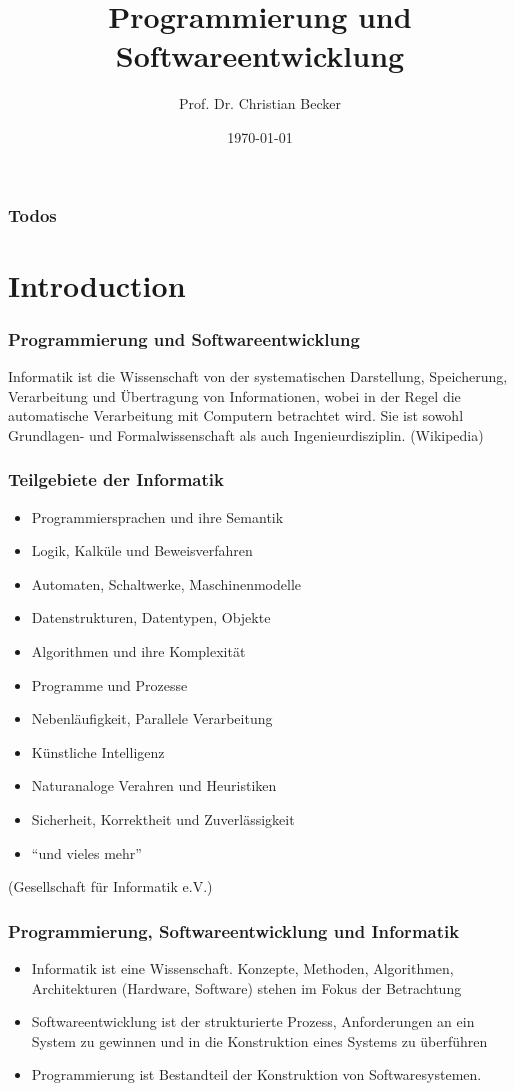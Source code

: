\documentclass{../../presentation}
\title{Programmierung und Softwareentwicklung}
\author{Prof. Dr. Christian Becker}
\institute{Universität Stuttgart, Institut für Parallele und Verteilte Systeme}
\date{\today}
\begin{document}
\begin{frame}
  \titlepage
\end{frame}

\begin{frame}
  \frametitle{Todos}
  \listoftodos{}
\end{frame}

\section{Introduction}

\begin{frame}[fragile]
  \frametitle{Programmierung und Softwareentwicklung}

  Informatik ist die Wissenschaft von der systematischen Darstellung, Speicherung, Verarbeitung und Übertragung von Informationen, wobei in der Regel die automatische Verarbeitung mit Computern betrachtet wird. Sie ist sowohl Grundlagen- und Formalwissenschaft als auch Ingenieurdisziplin. (Wikipedia)
\end{frame}

\begin{frame}[fragile]
  \frametitle{Teilgebiete der Informatik}

  \begin{itemize}
    \item Programmiersprachen und ihre Semantik
    \item Logik, Kalküle und Beweisverfahren
    \item Automaten, Schaltwerke, Maschinenmodelle
    \item Datenstrukturen, Datentypen, Objekte
    \item Algorithmen und ihre Komplexität
    \item Programme und Prozesse
    \item Nebenläufigkeit, Parallele Verarbeitung
    \item Künstliche Intelligenz
    \item Naturanaloge Verahren und Heuristiken
    \item Sicherheit, Korrektheit und Zuverlässigkeit
    \item \enquote{und vieles mehr}
  \end{itemize}
  (Gesellschaft für Informatik e.V.)
\end{frame}

\begin{frame}[fragile]
  \frametitle{Programmierung, Softwareentwicklung und Informatik}

  \begin{itemize}
    \item Informatik ist eine Wissenschaft. Konzepte, Methoden, Algorithmen, Architekturen (Hardware, Software) stehen im Fokus der Betrachtung
    \item Softwareentwicklung ist der strukturierte Prozess, Anforderungen an ein System zu gewinnen und in die Konstruktion eines Systems zu überführen
    \item Programmierung ist Bestandteil der Konstruktion von Softwaresystemen.
  \end{itemize}
\end{frame}
\end{document}
